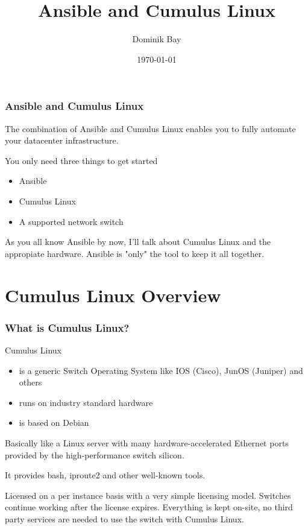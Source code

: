 \documentclass[10pt, compress]{beamer}
\title{Ansible and Cumulus Linux}
\subtitle{}
\date{\today}
\author{Dominik Bay}
\institute{rrbone, Dortmund \& grandcentrix, Cologne}
\begin{document}
\maketitle

\begin{frame}[fragile]
  \frametitle{Ansible and Cumulus Linux}

  The combination of Ansible and Cumulus Linux enables you to fully automate
  your datacenter infrastructure.

  You only need three things to get started
      \begin{itemize}
        \item Ansible \item Cumulus Linux \item A supported network switch
      \end{itemize}

  As you all know Ansible by now, I'll talk about Cumulus Linux and the
  appropiate hardware. Ansible is "only" the tool to keep it all together.

\end{frame}

\section{Cumulus Linux Overview}

\begin{frame}[fragile]
  \frametitle{What is Cumulus Linux?}

Cumulus Linux 
      \begin{itemize}
		\item is a generic Switch Operating System like IOS (Cisco), JunOS (Juniper) and others
		\item runs on industry standard hardware
		\item is based on Debian
      \end{itemize}

Basically like a Linux server with many hardware-accelerated Ethernet ports
provided by the high-performance switch silicon.

It provides bash, iproute2 and other well-known tools.

Licensed on a per instance basis with a very simple licensing model. Switches continue working after the license expires.
Everything is kept on-site, no third party services are needed to use the switch with Cumulus Linux.

\end{frame}
\end{document}
